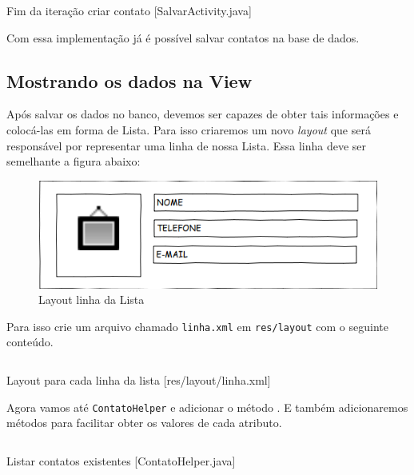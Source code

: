 \begin{listing}[H]
  \inputminted[linenos=true,frame=bottomline,tabsize=3]{ java }{ source/SalvarActivity-2.java }
  \caption{Fim da iteração criar contato [SalvarActivity.java]}
\end{listing}

Com essa implementação já é possível salvar contatos na base de dados.

\subsection{Mostrando os dados na View}

Após salvar os dados no banco, devemos ser capazes de obter tais informações e colocá-las em forma
de Lista. Para isso criaremos um novo \textit{layout} que será responsável por representar uma linha
de nossa Lista. Essa linha deve ser semelhante a figura abaixo:

\begin{figure}[h]
\centering
\includegraphics[scale=0.6]{img/layout-linha.png}
\caption{Layout linha da Lista}
\end{figure}

Para isso crie um arquivo chamado \texttt{linha.xml} em \texttt{res/layout} com o seguinte conteúdo.

\begin{listing}[H]
  \inputminted[linenos=true,frame=bottomline,tabsize=3]{ xml }{ source/linha-1.xml }
  \caption{Layout para cada linha da lista [res/layout/linha.xml]}
\end{listing}

Agora vamos até \texttt{ContatoHelper} e adicionar o método . E também adicionaremos
métodos para facilitar obter os valores de cada atributo.

\begin{listing}[H]
  \inputminted[linenos=true,frame=bottomline,tabsize=3]{ java }{ source/ContatoHelper-3.java }
  \caption{Listar contatos existentes [ContatoHelper.java]}
\end{listing}


